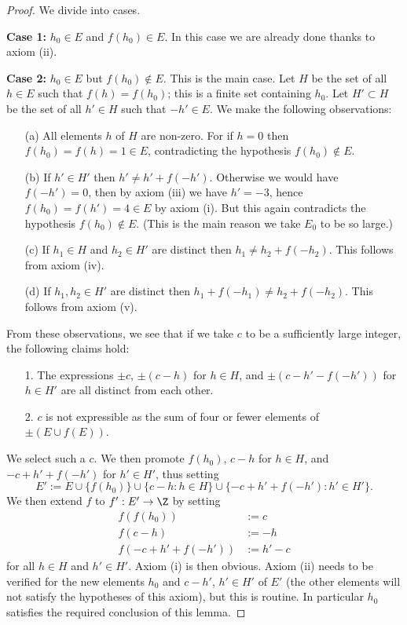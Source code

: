 \begin{proof}  We divide into cases.

  {\bf Case 1:} $h_0 \in E$ and $f(h_0) \in E$.  In this case we are already done thanks to axiom (ii).

  {\bf Case 2:} $h_0 \in E$ but $f(h_0) \not \in E$.  This is the main case.  Let $H$ be the set of all $h \in E$ such that $f(h) = f(h_0)$; this is a finite set containing $h_0$.  Let $H' \subset H$ be the set of all $h' \in H$ such that $-h' \in E$.  We make the following observations:
  \begin{itemize}
  \item[(a)] All elements $h$ of $H$ are non-zero.  For if $h=0$ then $f(h_0)=f(h)=1 \in E$, contradicting the hypothesis $f(h_0) \not \in E$.
  \item[(b)]  If $h' \in H'$ then $h' \neq h'+f(-h')$.  Otherwise we would have $f(-h')=0$, then by axiom (iii) we have $h' = -3$, hence $f(h_0) = f(h') = 4 \in E$ by axiom (i).  But this again contradicts the hypothesis $f(h_0) \not \in E$. (This is the main reason we take $E_0$ to be so large.)
  \item[(c)]  If $h_1 \in H$ and $h_2 \in H'$ are distinct then $h_1 \neq h_2+f(-h_2)$.  This follows from axiom (iv).
  \item[(d)]  If $h_1, h_2\in H'$ are distinct then $h_1+f(-h_1) \neq h_2+f(-h_2)$. This follows from axiom (v).
  \end{itemize}

  From these observations, we see that if we take $c$ to be a sufficiently large integer, the following claims hold:
  \begin{itemize}
  \item[1.]  The expressions $\pm c$, $\pm(c - h)$ for $h \in H$, and $\pm(c-h'-f(-h'))$ for $h \in H'$ are all distinct from each other.
  \item[2.]  $c$ is not expressible as the sum of four or fewer elements of $\pm (E \cup f(E))$.
  \end{itemize}

  We select such a $c$.  We then promote $f(h_0)$, $c - h$ for $h \in H$, and $-c+h'+f(-h')$ for $h' \in H'$, thus setting
  $$ E' := E \cup \{f(h_0)\} \cup \{ c-h: h \in H\} \cup \{ -c+h'+f(-h'): h' \in H'\}.$$
We then extend $f$ to $f': E' \to \Z$ by setting
\begin{align*}
  f(f(h_0)) &:= c \\
  f(c-h) &:= -h \\
  f(-c+h'+f(-h')) &:= h' - c
\end{align*}
for all $h \in H$ and $h' \in H'$.  Axiom (i) is then obvious.  Axiom (ii) needs to be verified for the new elements $h_0$ and $c-h'$, $h' \in H'$ of $E'$ (the other elements will not satisfy the hypotheses of this axiom), but this is routine.  In particular $h_0$ satisfies the required conclusion of this lemma.


\end{proof}
